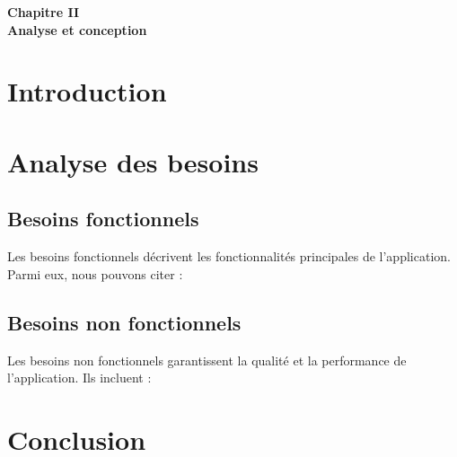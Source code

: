 
\vspace*{9cm}
\begin{doublespace}
    \centering
    \textbf{ \huge Chapitre II \\ [1 cm] Analyse et conception}
\end{doublespace}

\newpage
\fancyhead[R]{\rightmark}

\setcounter{section}{0}
\section*{Introduction}


\section{Analyse des besoins}


\subsection{Besoins fonctionnels}
Les besoins fonctionnels décrivent les fonctionnalités principales de l'application. Parmi eux, nous pouvons citer :

\subsection{Besoins non fonctionnels}
Les besoins non fonctionnels garantissent la qualité et la performance de l'application. Ils incluent :


\section*{Conclusion}

